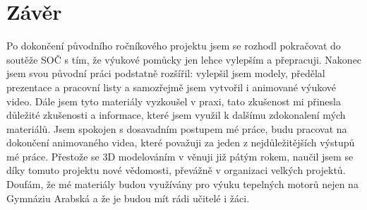 \section{Závěr}
{Po dokončení původního ročníkového projektu jsem se rozhodl pokračovat do soutěže SOČ s tím, že výukové pomůcky jen lehce vylepším a přepracuji. Nakonec jsem svou původní práci podstatně rozšířil: vylepšil jsem modely, předělal prezentace a pracovní listy a samozřejmě jsem vytvořil i animované výukové video.}\odst
{Dále jsem tyto materiály vyzkoušel v praxi, tato zkušenost mi přinesla důležité zkušenosti a informace, které jsem využil k dalšímu zdokonalení mých materiálů. Jsem spokojen s dosavadním postupem mé práce, budu pracovat na dokončení animovaného videa, které považuji za jeden z nejdůležitějších výstupů mé práce.}\odst
{Přestože se 3D modelováním v  věnuji již pátým rokem, naučil jsem se díky tomuto projektu nové vědomosti, převážně v organizaci velkých projektů. Doufám, že mé materiály budou využívány pro výuku tepelných motorů nejen na Gymnáziu Arabská a že je budou mít rádi učitelé i žáci.}